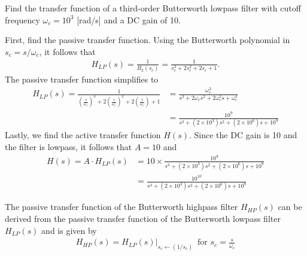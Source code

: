 \documentclass{report}
\begin{document}
\begin{example}
    Find the transfer function of a third-order Butterworth lowpass filter with cutoff frequency $\omega_c = 10^3$ [rad/s] and a DC gain of 10.
\end{example}
\begin{solution}
    First, find the passive transfer function. Using the Butterworth polynomial in $s_c = s/\omega_c$, it follows that
    \begin{align*}
        H_{LP}(s) = \frac{1}{B_3(s_c)} = \frac{1}{s_c^3+2s_c^2+2s_c+1}.
    \end{align*}
    The passive transfer function simplifies to
    \begin{align*}
        H_{LP}(s) = \frac{1}{\left(\frac{s}{\omega_c}\right)^3+2\left(\frac{s}{\omega_c}\right)^2+2\left(\frac{s}{\omega_c}\right)+1} &= \frac{\omega_c^3}{s^3+2\omega_c s^2+2\omega_c^2s+\omega_c^3} \\ 
        &= \frac{10^9}{s^3+(2\times 10^3)s^2+(2\times 10^6)s+10^9}
    \end{align*}
    Lastly, we find the active transfer function $H(s)$. Since the DC gain is 10 and the filter is lowpass, it follows that $A=10$ and 
    \begin{align*}
        H(s) = A\cdot H_{LP}(s) &= 10 \times \frac{10^9}{s^3+(2\times 10^3)s^2+(2\times 10^6)s+10^9} \\ 
        &= \frac{10^{10}}{s^3+(2\times 10^3)s^2+(2\times 10^6)s+10^9}
    \end{align*}
\end{solution}

\noindent The passive transfer function of the Butterworth highpass filter $H_{HP}(s)$ can be derived from 
the passive transfer function of the Butterworth lowpass filter $H_{LP}(s)$ and is given by 
\begin{align}
    H_{HP}(s) = H_{LP}(s)\bigg|_{s_c\leftarrow (1/s_c)}\, \text{ for } s_c = \frac{s}{\omega_c}
\end{align}
\end{document}
